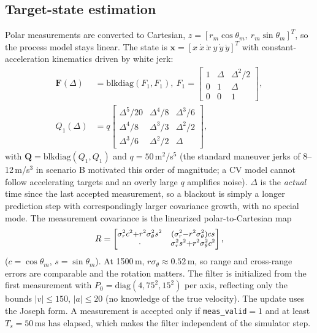 \documentclass[10pt, conference]{IEEEtran}
\begin{document}
\subsection{Target-state estimation}
Polar measurements are converted to Cartesian, $z=[r_m\cos\theta_m,\ r_m\sin\theta_m]^T$, so the process model stays linear. The state is $\mathbf{x}=[x\ \dot x\ \ddot x\ y\ \dot y\ \ddot y]^T$ with constant-acceleration kinematics driven by white jerk:
\begin{align}
\mathbf{F}(\Delta)&=\text{blkdiag}(F_1,F_1),\ F_1=\begin{bmatrix}1&\Delta&\Delta^2/2\\0&1&\Delta\\0&0&1\end{bmatrix},\\
Q_1(\Delta)&=q\begin{bmatrix}\Delta^5/20&\Delta^4/8&\Delta^3/6\\ \Delta^4/8&\Delta^3/3&\Delta^2/2\\ \Delta^3/6&\Delta^2/2&\Delta\end{bmatrix},
\end{align}
with $\mathbf Q=\text{blkdiag}(Q_1,Q_1)$ and $q=50$\,m$^2$/s$^5$ (the standard maneuver jerks of 8--12\,m/s$^3$ in scenario B motivated this order of magnitude; a CV model cannot follow accelerating targets and an overly large $q$ amplifies noise). $\Delta$ is the \emph{actual} time since the last accepted measurement, so a blackout is simply a longer prediction step with correspondingly larger covariance growth, with no special mode. The measurement covariance is the linearized polar-to-Cartesian map
\begin{equation}\small
R=\begin{bmatrix}\sigma_r^2c^2{+}r^2\sigma_\theta^2s^2&(\sigma_r^2{-}r^2\sigma_\theta^2)cs\\ \cdot&\sigma_r^2s^2{+}r^2\sigma_\theta^2c^2\end{bmatrix},
\end{equation}
($c=\cos\theta_m$, $s=\sin\theta_m$). At 1500\,m, $r\sigma_\theta\approx0.52$\,m, so range and cross-range errors are comparable and the rotation matters. The filter is initialized from the first measurement with $P_0=\text{diag}(4,75^2,15^2)$ per axis, reflecting only the bounds $|v|\le150$, $|a|\le20$ (no knowledge of the true velocity). The update uses the Joseph form. A measurement is accepted only if \texttt{meas\_valid}$=1$ and at least $T_s=50$\,ms has elapsed, which makes the filter independent of the simulator step.
\end{document}
